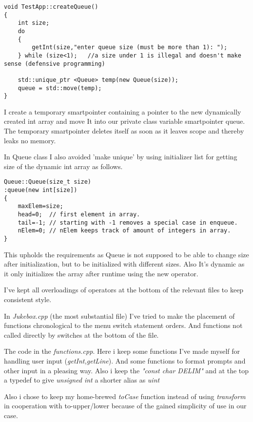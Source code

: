 \documentclass[11pt]{article}
\begin{document}
\begin{lstlisting}
void TestApp::createQueue()
{
	int size;
	do
	{
		getInt(size,"enter queue size (must be more than 1): ");
	} while (size<1); 	//a size under 1 is illegal and doesn't make sense (defensive programming)

	std::unique_ptr <Queue> temp(new Queue(size));
	queue = std::move(temp);
}
\end{lstlisting}

I create a temporary smartpointer containing a pointer to the new dynamically created int array and move It into our private class variable smartpointer queue.
The temporary smartpointer deletes itself as soon as it leaves scope and thereby leaks no memory.

In Queue class I also avoided 'make unique' by using initializer list for getting size of the dynamic int array as follows. 

\begin{lstlisting}
Queue::Queue(size_t size)
:queue(new int[size])
{
	maxElem=size;
	head=0;	 // first element in array.
	tail=-1; // starting with -1 removes a special case in enqueue.
	nElem=0; // nElem keeps track of amount of integers in array.
}
\end{lstlisting}

This upholds the requirements as Queue is not supposed to be able to change size after initialization, but to be initialized with different sizes. Also It's dynamic as it only initializes the array after runtime using the new operator.




I've kept all overloadings of operators at the bottom of the relevant files to keep consistent style.

In \emph{Jukebox.cpp} (the most substantial file) I've tried to make the placement of functions chronological to the menu switch statement orders. And functions not called directly by switches at the bottom of the file. 


The code in the \emph{functions.cpp}. Here i keep some functions I've made myself for handling user input (\emph{getInt,getLine}). And some functions to format prompts and other input in a pleasing way. Also i keep the 
\emph{"const char DELIM"} and at the top a typedef to give \emph{unsigned int} a shorter alias as \emph{uint}

Also i chose to keep my home-brewed \emph{toCase} function instead of using \emph{transform} in cooperation with to-upper/lower because of the gained simplicity of use in our case.
\end{document}
